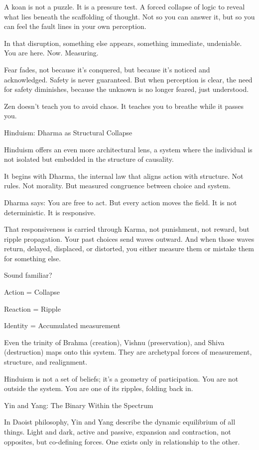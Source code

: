 \documentclass[12pt]{article}
\begin{document}
A koan is not a puzzle. It is a pressure test. A forced collapse of logic to reveal what lies beneath the scaffolding of thought. Not so you can answer it, but so you can feel the fault lines in your own perception.

In that disruption, something else appears, something immediate, undeniable. 
You are here. Now. Measuring.

Fear fades, not because it’s conquered, but because it’s noticed and acknowledged. 
Safety is never guaranteed. But when perception is clear, the need for safety diminishes, because the unknown is no longer feared, just understood.

Zen doesn’t teach you to avoid chaos.
It teaches you to breathe while it passes you.

Hinduism: Dharma as Structural Collapse

Hinduism offers an even more architectural lens, a system where the individual is not isolated but embedded in the structure of causality.

It begins with Dharma, the internal law that aligns action with structure.
Not rules. Not morality. But measured congruence between choice and system.

Dharma says: You are free to act. But every action moves the field.
It is not deterministic. It is responsive.

That responsiveness is carried through Karma, not punishment, not reward, but ripple propagation. Your past choices send waves outward. And when those waves return, delayed, displaced, or distorted, you either measure them or mistake them for something else.

Sound familiar?

Action = Collapse

Reaction = Ripple

Identity = Accumulated measurement

Even the trinity of Brahma (creation), Vishnu (preservation), and Shiva (destruction) maps onto this system. They are archetypal forces of measurement, structure, and realignment.

Hinduism is not a set of beliefs; it’s a geometry of participation.
You are not outside the system. You are one of its ripples, folding back in.

Yin and Yang: The Binary Within the Spectrum

In Daoist philosophy, Yin and Yang describe the dynamic equilibrium of all things. Light and dark, active and passive, expansion and contraction, not opposites, but co-defining forces. One exists only in relationship to the other.
\end{document}
